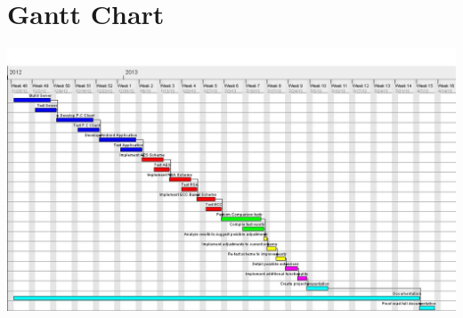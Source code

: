 \documentclass[a4paper,10pt]{report}
\begin{document}
\appendix
\chapter{Gantt Chart}\label{A}
\includegraphics[scale=0.35, angle=270]{ProgReportChart.jpg}


\end{document}
